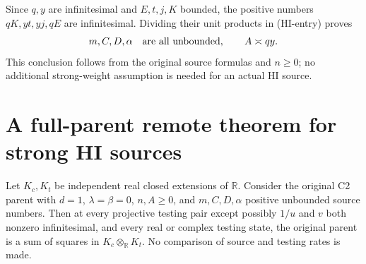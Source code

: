Since $q,y$ are infinitesimal and $E,t,j,K$ bounded, the positive
numbers $qK,yt,yj,qE$ are infinitesimal. Dividing their unit
products in (HI-entry) proves
\[
 m,C,D,\alpha\quad\hbox{are all unbounded},\qquad
 A\asymp qy.
\]
This conclusion follows from the original source formulas and
$n\geq0$; no additional strong-weight assumption is needed for
an actual HI source.


\section{\texorpdfstring{A full-parent remote theorem for strong HI sources}{A full-parent remote theorem for strong HI sources}}
\label{component:pcee1372511ed}

\label{pcee1372511ed:sec:hi-remote}
\begin{theorem}
Let $K_c,K_t$ be independent real closed extensions of $\mathbb R$.
Consider the original C2 parent with $d=1$, $\lambda=\beta=0$,
$n,A\geq0$, and $m,C,D,\alpha$ positive unbounded source numbers.
Then at every projective testing pair except possibly
$1/u$ and $v$ both nonzero infinitesimal, and every real or complex testing
state, the
original parent is a sum of squares in $K_c\otimes_{\mathbb R}K_t$.
No comparison of source and testing rates is made.
\end{theorem}

